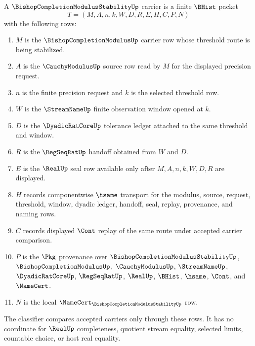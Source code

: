 \begin{definition}
\label{def:bishop-completion-modulus-stability-carrier}
A $\BishopCompletionModulusStabilityUp$ carrier is a finite $\BHist$ packet
$$
T=(M,A,n,k,W,D,R,E,H,C,P,N)
$$
with the following rows:
\begin{enumerate}
\item $M$ is the $\BishopCompletionModulusUp$ carrier row whose threshold route is being stabilized.
\item $A$ is the $\CauchyModulusUp$ source row read by $M$ for the displayed precision request.
\item $n$ is the finite precision request and $k$ is the selected threshold row.
\item $W$ is the $\StreamNameUp$ finite observation window opened at $k$.
\item $D$ is the $\DyadicRatCoreUp$ tolerance ledger attached to the same threshold and window.
\item $R$ is the $\RegSeqRatUp$ handoff obtained from $W$ and $D$.
\item $E$ is the $\RealUp$ seal row available only after $M,A,n,k,W,D,R$ are displayed.
\item $H$ records componentwise $\hsame$ transport for the modulus, source, request, threshold, window, dyadic ledger, handoff, seal, replay, provenance, and naming rows.
\item $C$ records displayed $\Cont$ replay of the same route under accepted carrier comparison.
\item $P$ is the $\Pkg$ provenance over $\BishopCompletionModulusStabilityUp$, $\BishopCompletionModulusUp$, $\CauchyModulusUp$, $\StreamNameUp$, $\DyadicRatCoreUp$, $\RegSeqRatUp$, $\RealUp$, $\BHist$, $\hsame$, $\Cont$, and $\NameCert$.
\item $N$ is the local $\NameCert_{\BishopCompletionModulusStabilityUp}$ row.
\end{enumerate}
The classifier compares accepted carriers only through these rows. It has no coordinate for $\RealUp$ completeness, quotient stream equality, selected limits, countable choice, or host real equality.
\end{definition}

